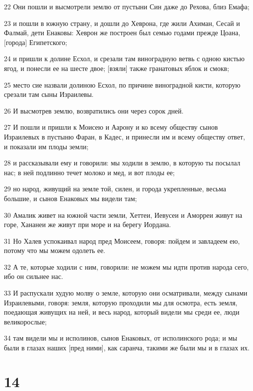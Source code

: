 \par 22 Они пошли и высмотрели землю от пустыни Син даже до Рехова, близ Емафа;
\par 23 и пошли в южную страну, и дошли до Хеврона, где жили Ахиман, Сесай и Фалмай, дети Енаковы: Хеврон же построен был семью годами прежде Цоана, [города] Египетского;
\par 24 и пришли к долине Есхол, и срезали там виноградную ветвь с одною кистью ягод, и понесли ее на шесте двое; [взяли] также гранатовых яблок и смокв;
\par 25 место сие назвали долиною Есхол, по причине виноградной кисти, которую срезали там сыны Израилевы.
\par 26 И высмотрев землю, возвратились они через сорок дней.
\par 27 И пошли и пришли к Моисею и Аарону и ко всему обществу сынов Израилевых в пустыню Фаран, в Кадес, и принесли им и всему обществу ответ, и показали им плоды земли;
\par 28 и рассказывали ему и говорили: мы ходили в землю, в которую ты посылал нас; в ней подлинно течет молоко и мед, и вот плоды ее;
\par 29 но народ, живущий на земле той, силен, и города укрепленные, весьма большие, и сынов Енаковых мы видели там;
\par 30 Амалик живет на южной части земли, Хеттеи, Иевусеи и Аморреи живут на горе, Хананеи же живут при море и на берегу Иордана.
\par 31 Но Халев успокаивал народ пред Моисеем, говоря: пойдем и завладеем ею, потому что мы можем одолеть ее.
\par 32 А те, которые ходили с ним, говорили: не можем мы идти против народа сего, ибо он сильнее нас.
\par 33 И распускали худую молву о земле, которую они осматривали, между сынами Израилевыми, говоря: земля, которую проходили мы для осмотра, есть земля, поедающая живущих на ней, и весь народ, который видели мы среди ее, люди великорослые;
\par 34 там видели мы и исполинов, сынов Енаковых, от исполинского рода; и мы были в глазах наших [пред ними], как саранча, такими же были мы и в глазах их.

\chapter{14}

